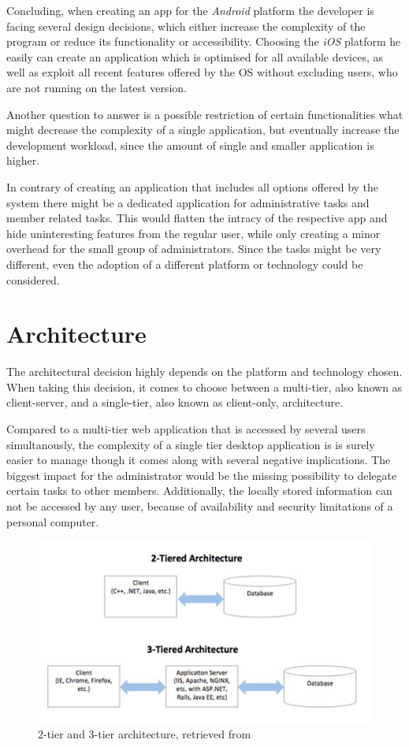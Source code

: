 Concluding, when creating an app for the \emph{Android} platform the developer is facing several design decisions, which either increase the complexity of the program or reduce its functionality or accessibility. Choosing the \emph{iOS} platform he easily can create an application which is optimised for all available devices, as well as exploit all recent features offered by the \gls{OS} without excluding users, who are not running on the latest version. 

Another question to answer is a possible restriction of certain functionalities what might decrease the complexity of a single application, but eventually increase the development workload, since the amount of single and smaller application is higher. 

In contrary of creating an application that includes all options offered by the system there might be a dedicated application for administrative tasks and member related tasks. This would flatten the intracy of the respective app and hide uninteresting features from the regular user, while only creating a minor overhead for the small group of administrators. Since the tasks might be very different, even the adoption of a different platform or technology could be considered. 

\section{Architecture} %
\label{sec:Architecture}
The architectural decision highly depends on the platform and technology chosen. When taking this decision, it comes to choose between a multi-tier, also known as client-server, and a single-tier, also known as client-only, architecture.

Compared to a multi-tier web application that is accessed by several users simultanously, the complexity of a single tier desktop application is is surely easier to manage though it comes along with several negative implications. The biggest impact for the administrator would be the missing possibility to delegate certain tasks to other members. Additionally, the locally stored information can not be accessed by any user, because of availability and security limitations of a personal computer.

\begin{figure}[h]
  	\centering
  	\includegraphics[width=0.7\linewidth]{./images/tier-architecture.jpg}
  	\caption{2-tier and 3-tier architecture, retrieved from \cite{Wright:2015aa}}
	\label{fig:TierArchitecture}
\end{figure}
\nocite{Wright:2015aa}

